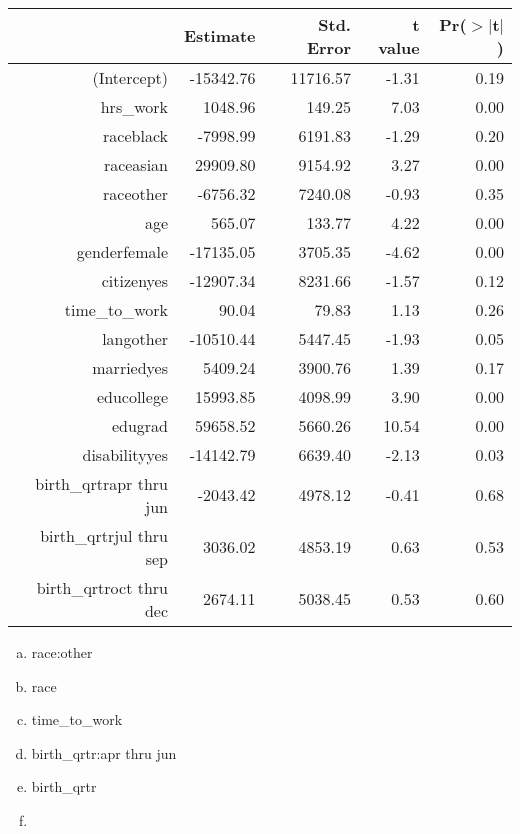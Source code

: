 \documentclass[slidestop,compress,mathserif,12pt,t,professionalfonts,xcolor=table]{beamer}
\newcommand{\solnMult}[1]{#1}
\begin{document}
\begin{frame}
\frametitle{}


\begin{center}
{\tiny
\begin{tabular}{rrrrr}
  \hline
 & Estimate & Std. Error & t value & Pr($>$$|$t$|$) \\ 
  \hline
(Intercept) & -15342.76 & 11716.57 & -1.31 & 0.19 \\ 
  hrs\_work & 1048.96 & 149.25 & 7.03 & 0.00 \\ 
  raceblack & -7998.99 & 6191.83 & -1.29 & 0.20 \\ 
  raceasian & 29909.80 & 9154.92 & 3.27 & 0.00 \\ 
  raceother & -6756.32 & 7240.08 & -0.93 & 0.35 \\ 
  age & 565.07 & 133.77 & 4.22 & 0.00 \\ 
  genderfemale & -17135.05 & 3705.35 & -4.62 & 0.00 \\ 
  citizenyes & -12907.34 & 8231.66 & -1.57 & 0.12 \\ 
  time\_to\_work & 90.04 & 79.83 & 1.13 & 0.26 \\ 
  langother & -10510.44 & 5447.45 & -1.93 & 0.05 \\ 
  marriedyes & 5409.24 & 3900.76 & 1.39 & 0.17 \\ 
  educollege & 15993.85 & 4098.99 & 3.90 & 0.00 \\ 
  edugrad & 59658.52 & 5660.26 & 10.54 & 0.00 \\ 
  disabilityyes & -14142.79 & 6639.40 & -2.13 & 0.03 \\ 
  birth\_qrtrapr thru jun & -2043.42 & 4978.12 & -0.41 & 0.68 \\ 
  birth\_qrtrjul thru sep & 3036.02 & 4853.19 & 0.63 & 0.53 \\ 
  birth\_qrtroct thru dec & 2674.11 & 5038.45 & 0.53 & 0.60 \\ 
   \hline
\end{tabular}
}
\end{center}

\begin{multicols}{2}
\begin{enumerate}[(a)]
\item race:other
\item race
\item time\_to\_work
\item birth\_qrtr:apr thru jun
\item \solnMult{birth\_qrtr}
\item[]
\end{enumerate}
\end{multicols}

\end{frame}
\end{document}
